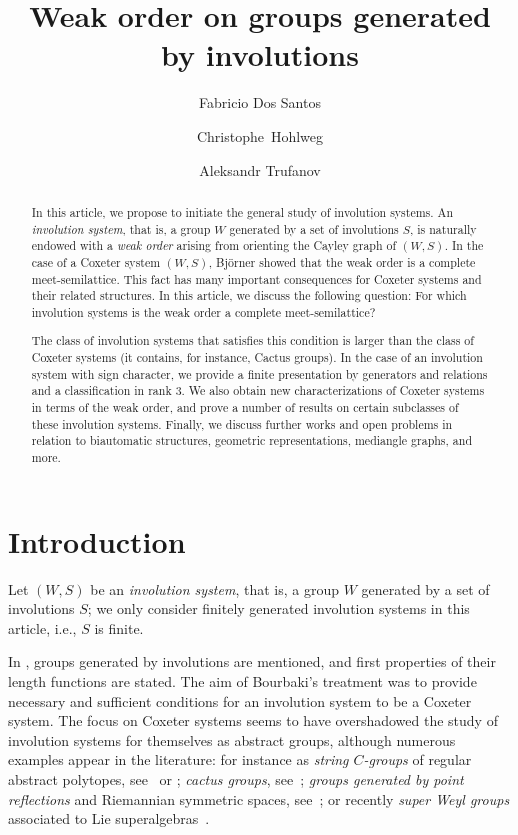 \documentclass[A4paper, oneside]{amsart}
\title{Weak order on groups generated by involutions}
\author[F. Dos Santos]{Fabricio Dos Santos}
\author[C. Hohlweg]{Christophe~Hohlweg}
\author[A. Trufanov]{Aleksandr Trufanov}
\theoremstyle{definition}
\begin{document}
\begin{abstract} In this article, we propose to initiate the general study of involution systems.  An {\em involution system}, that is, a group $W$ generated by a set of involutions $S$, is naturally endowed with a {\em weak order} arising from orienting the Cayley graph of $(W,S)$. In the case of a Coxeter system $(W,S)$, Bj\"orner showed that the weak order is a complete meet-semilattice. This fact has many important consequences for Coxeter systems and their related structures. In this article, we discuss the following question: For which involution systems is the weak order a complete meet-semilattice?

The class of involution systems that satisfies this condition is larger than the class of Coxeter systems (it contains, for instance, Cactus groups). In the case of an involution system with sign character, we provide a finite presentation by generators and relations and a classification in rank 3. We also obtain new characterizations of Coxeter systems in terms of the weak order, and prove a number of results on certain subclasses of these involution systems. Finally, we discuss further works and open problems in relation to biautomatic structures, geometric representations, mediangle graphs, and more.
\end{abstract}



\maketitle

\setcounter{tocdepth}{1}
\tableofcontents 

\section{Introduction} Let $(W,S)$ be an {\em involution system}, that is, a group $W$ generated by a set of involutions $S$; we only consider finitely generated involution systems in this article, i.e., $S$ is finite. 

In \cite[Ch. IV, \S1.1-\S1.3]{Bo68}, groups generated by involutions are mentioned, and first properties of their length functions are stated. The aim of Bourbaki's treatment was to provide necessary and sufficient conditions for an involution system to be a Coxeter system. The focus on Coxeter systems seems to have overshadowed the study of involution systems for themselves as abstract groups, although numerous examples appear in the literature: for instance as {\em string $C$-groups} of regular abstract polytopes, see~\cite{McSc02} or \cite{Lee21}; {\em cactus groups}, see~\cite{BlowUps,HeKa06, Devadoss};  {\em  groups generated by point reflections} and Riemannian symmetric spaces, see~\cite{Lo69}; or recently {\em super Weyl groups} associated to Lie superalgebras~\cite{WeylSuper24}.
\end{document}
